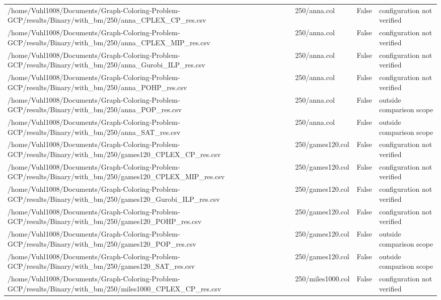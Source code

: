 \begin{table}[htbp]
\begin{tabular}{llll}
/home/Vuhl1008/Documents/Graph-Coloring-Problem-GCP/results/Binary/with\_bm/250/anna\_CPLEX\_CP\_res.csv & 250/anna.col & False & configuration not verified \\
/home/Vuhl1008/Documents/Graph-Coloring-Problem-GCP/results/Binary/with\_bm/250/anna\_CPLEX\_MIP\_res.csv & 250/anna.col & False & configuration not verified \\
/home/Vuhl1008/Documents/Graph-Coloring-Problem-GCP/results/Binary/with\_bm/250/anna\_Gurobi\_ILP\_res.csv & 250/anna.col & False & configuration not verified \\
/home/Vuhl1008/Documents/Graph-Coloring-Problem-GCP/results/Binary/with\_bm/250/anna\_POHP\_res.csv & 250/anna.col & False & configuration not verified \\
/home/Vuhl1008/Documents/Graph-Coloring-Problem-GCP/results/Binary/with\_bm/250/anna\_POP\_res.csv & 250/anna.col & False & outside comparison scope \\
/home/Vuhl1008/Documents/Graph-Coloring-Problem-GCP/results/Binary/with\_bm/250/anna\_SAT\_res.csv & 250/anna.col & False & outside comparison scope \\
/home/Vuhl1008/Documents/Graph-Coloring-Problem-GCP/results/Binary/with\_bm/250/games120\_CPLEX\_CP\_res.csv & 250/games120.col & False & configuration not verified \\
/home/Vuhl1008/Documents/Graph-Coloring-Problem-GCP/results/Binary/with\_bm/250/games120\_CPLEX\_MIP\_res.csv & 250/games120.col & False & configuration not verified \\
/home/Vuhl1008/Documents/Graph-Coloring-Problem-GCP/results/Binary/with\_bm/250/games120\_Gurobi\_ILP\_res.csv & 250/games120.col & False & configuration not verified \\
/home/Vuhl1008/Documents/Graph-Coloring-Problem-GCP/results/Binary/with\_bm/250/games120\_POHP\_res.csv & 250/games120.col & False & configuration not verified \\
/home/Vuhl1008/Documents/Graph-Coloring-Problem-GCP/results/Binary/with\_bm/250/games120\_POP\_res.csv & 250/games120.col & False & outside comparison scope \\
/home/Vuhl1008/Documents/Graph-Coloring-Problem-GCP/results/Binary/with\_bm/250/games120\_SAT\_res.csv & 250/games120.col & False & outside comparison scope \\
/home/Vuhl1008/Documents/Graph-Coloring-Problem-GCP/results/Binary/with\_bm/250/miles1000\_CPLEX\_CP\_res.csv & 250/miles1000.col & False & configuration not verified \\

\end{tabular}
\end{table}
